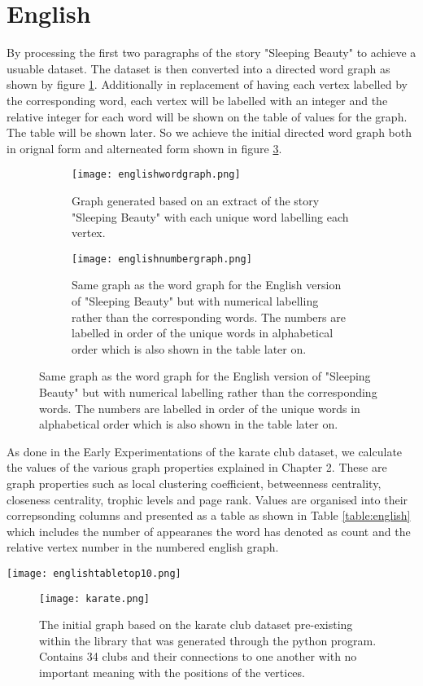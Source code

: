\section{English}
By processing the first two paragraphs of the story "Sleeping Beauty" to achieve a usuable dataset. The dataset is then converted into a directed word graph as shown by figure \ref{fig:engword}. Additionally in replacement of having each vertex labelled by the corresponding word, each vertex will be labelled with an integer and the relative integer for each word will be shown on the table of values for the graph. The table will be shown later. So we achieve the initial directed word graph both in orignal form and alterneated form shown in figure \ref{fig:engnum}.

\begin{figure}[H]
\centering
\begin{subfigure}{.45\textwidth}
	\texttt{[image: englishwordgraph.png]}
	\caption{Graph generated based on an extract of the story "Sleeping Beauty" with each unique word labelling each vertex.}
	\label{fig:engword}
\end{subfigure}
\hfill
\begin{subfigure}{.45\textwidth}
	\texttt{[image: englishnumbergraph.png]}
	\caption{Same graph as the word graph for the English version of "Sleeping Beauty" but with numerical labelling rather than the corresponding words. The numbers are labelled in order of the unique words in alphabetical order which is also shown in the table later on.}
	\label{fig:engnum}
\end{subfigure}
\end{figure}

As done in the Early Experimentations of the karate club dataset, we calculate the values of the various graph properties explained in Chapter 2. These are graph properties such as local clustering coefficient, betweenness centrality, closeness centrality, trophic levels and page rank. Values are organised into their correpsonding columns and presented as a table as shown in Table \ref{table:english} which includes the number of appearanes the word has denoted as count and the relative vertex number in the numbered english graph.

\begin{table}[H]
	\centering
	\texttt{[image: englishtabletop10.png]}
	\caption{The initial graph based on the karate club dataset pre-existing within the library that was generated through the python program. Contains 34 clubs and their connections to one another with no important meaning with the positions of the vertices.}
	\label{table:english}
\end{table}


\begin{figure}[H]
	\centering
	\texttt{[image: karate.png]}
	\caption{The initial graph based on the karate club dataset pre-existing within the library that was generated through the python program. Contains 34 clubs and their connections to one another with no important meaning with the positions of the vertices.}
	\label{fig:karate}
\end{figure}
